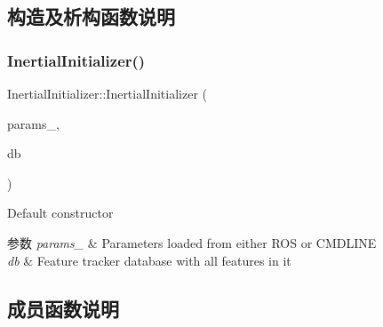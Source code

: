 \subsection{构造及析构函数说明}
\mbox{\label{classov__init_1_1InertialInitializer_ab53c9effb332d8259cd04e06ab26ce5f}} 
\subsubsection{\texorpdfstring{Inertial\+Initializer()}{InertialInitializer()}}
{\footnotesize\ttfamily Inertial\+Initializer\+::\+Inertial\+Initializer (\begin{DoxyParamCaption}\item[{\hyperlink{structov__init_1_1InertialInitializerOptions}{Inertial\+Initializer\+Options} \&}]{params\+\_\+,  }\item[{std\+::shared\+\_\+ptr$<$ \hyperlink{classov__core_1_1FeatureDatabase}{ov\+\_\+core\+::\+Feature\+Database} $>$}]{db }\end{DoxyParamCaption})\hspace{0.3cm}{\ttfamily [explicit]}}



Default constructor 


\begin{DoxyParams}{参数}
{\em params\+\_\+} & Parameters loaded from either R\+OS or C\+M\+D\+L\+I\+NE \\
\hline
{\em db} & Feature tracker database with all features in it \\
\hline
\end{DoxyParams}


\subsection{成员函数说明}
\mbox{\label{classov__init_1_1InertialInitializer_ac7f060d9cfedc4f780574ad436c34b66}} 
